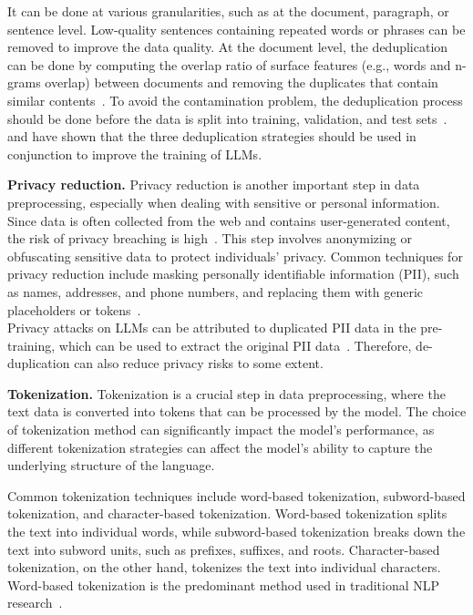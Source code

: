 It can be done at various granularities, such as at the document, paragraph, or sentence level.
Low-quality sentences containing repeated words or phrases can be removed to improve the data quality.
At the document level, the deduplication can be done by computing the overlap ratio of surface features (e.g., words and n-grams overlap) between documents and removing the duplicates that contain similar contents~\cite{touvron2023llama,rae2021scaling,workshop2023bloom,lee2022deduplicating}.
To avoid the contamination problem, the deduplication process should be done before the data is split into training, validation, and test sets~\cite{chowdhery2022palm}.
\textcite{chowdhery2022palm} and \textcite{carlini2022quantifying} have shown that the three deduplication strategies should be used in conjunction to improve the training of LLMs.

\textbf{Privacy reduction.}
Privacy reduction is another important step in data preprocessing, especially when dealing with sensitive or personal information.
Since data is often collected from the web and contains user-generated content, the risk of privacy breaching is high~\cite{carlini2021extracting}.
This step involves anonymizing or obfuscating sensitive data to protect individuals' privacy.
Common techniques for privacy reduction include masking personally identifiable information (PII), such as names, addresses, and phone numbers, and replacing them with generic placeholders or tokens~\cite{laurencon2022bigscience}.\\
Privacy attacks on LLMs can be attributed to duplicated PII data in the pre-training, which can be used to extract the original PII data~\cite{lee2022deduplicating}.
Therefore, de-duplication can also reduce privacy risks to some extent.

\textbf{Tokenization.}
Tokenization is a crucial step in data preprocessing, where the text data is converted into tokens that can be processed by the model.
The choice of tokenization method can significantly impact the model's performance, as different tokenization strategies can affect the model's ability to capture the underlying structure of the language.

Common tokenization techniques include word-based tokenization, subword-based tokenization, and character-based tokenization.
Word-based tokenization splits the text into individual words, while subword-based tokenization breaks down the text into subword units, such as prefixes, suffixes, and roots.
Character-based tokenization, on the other hand, tokenizes the text into individual characters.
Word-based tokenization is the predominant method used in traditional NLP research~\cite{lafferty2001conditional}.


